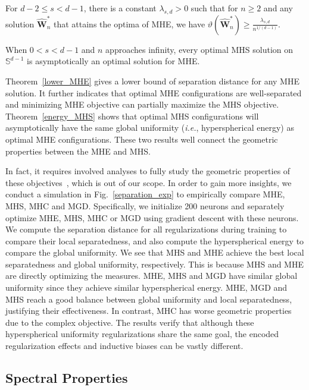 \begin{theorem}\label{lower_MHE}
For $d-2\leq s< d-1$, there is a constant $\lambda_{s,d}>0$ such that for $n\geq 2$ and any solution $\hat{\bm{W}}^*_n$ that attains the optima of MHE, we have $\vartheta(\hat{\bm{W}}^*_n)\geq\frac{\lambda_{s,d}}{n^{1/(d-1)}}$.
\end{theorem}

\begin{theorem}\label{energy_MHS}
When $0<s<d-1$ and $n$ approaches infinity, every optimal MHS solution on $\mathbb{S}^{d-1}$ is asymptotically an optimal solution for MHE.
\end{theorem}

Theorem~\ref{lower_MHE} gives a lower bound of separation distance for any MHE solution. It further indicates that optimal MHE configurations are well-separated and minimizing MHE objective can partially maximize the MHS objective. Theorem~\ref{energy_MHS} shows that optimal MHS configurations will asymptotically have the same global uniformity (\emph{i.e.}, hyperspherical energy) as optimal MHE configurations. These two results well connect the geometric properties between the MHE and MHS.

In fact, it requires involved analyses to fully study the geometric properties of these objectives~\cite{borodachov2007asymptotics,borodachov2019discrete}, which is out of our scope. In order to gain more insights, we conduct a simulation in Fig.~\ref{separation_exp} to empirically compare MHE, MHS, MHC and MGD. Specifically, we initialize 200 neurons and separately optimize MHE, MHS, MHC or MGD using gradient descent with these neurons. We compute the separation distance for all regularizations during training to compare their local separatedness, and also compute the hyperspherical energy to compare the global uniformity. We see that MHS and MHE achieve the best local separatedness and global uniformity, respectively. This is because MHS and MHE are directly optimizing the measures. MHE, MHS and MGD have similar global uniformity since they achieve similar hyperspherical energy. MHE, MGD and MHS reach a good balance between global uniformity and local separatedness, justifying their effectiveness. In contrast, MHC has worse geometric properties due to the complex objective. The results verify that although these hyperspherical uniformity regularizations share the same goal, the encoded regularization effects and inductive biases can be vastly different.

\subsection{Spectral Properties}

